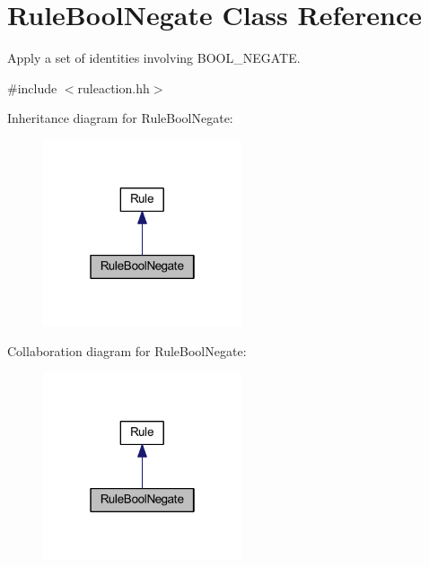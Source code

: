 \hypertarget{class_rule_bool_negate}{}\section{Rule\+Bool\+Negate Class Reference}
\label{class_rule_bool_negate}


Apply a set of identities involving B\+O\+O\+L\+\_\+\+N\+E\+G\+A\+TE.  




{\ttfamily \#include $<$ruleaction.\+hh$>$}



Inheritance diagram for Rule\+Bool\+Negate\+:
\nopagebreak
\begin{figure}[H]
\begin{center}
\leavevmode
\includegraphics[width=166pt]{class_rule_bool_negate__inherit__graph}
\end{center}
\end{figure}


Collaboration diagram for Rule\+Bool\+Negate\+:
\nopagebreak
\begin{figure}[H]
\begin{center}
\leavevmode
\includegraphics[width=166pt]{class_rule_bool_negate__coll__graph}
\end{center}
\end{figure}
